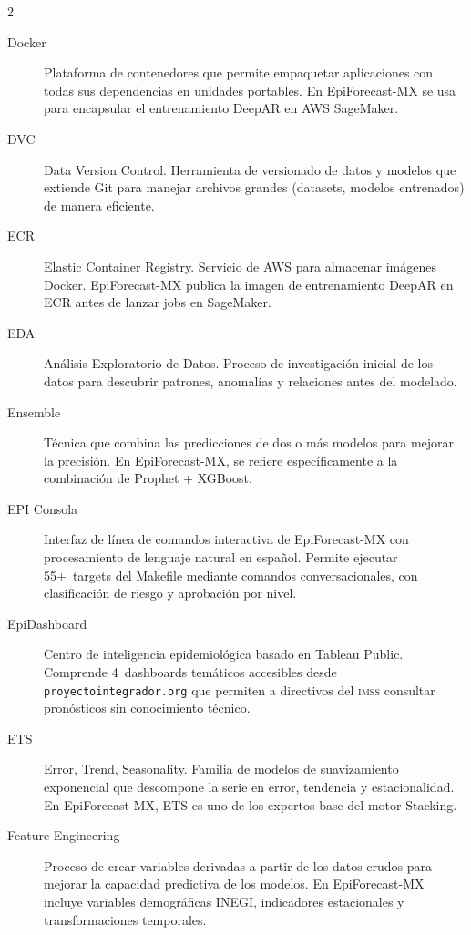 \documentclass[12pt, letterpaper]{article}
\newcommand{\imss}{\textnormal{\textsc{imss}}}
\begin{document}
\begin{multicols}{2}
\begin{description}
\item[Docker]
Plataforma de contenedores que permite empaquetar aplicaciones con todas sus dependencias en unidades portables. En EpiForecast-MX se usa para encapsular el entrenamiento DeepAR en AWS SageMaker.

\item[DVC]
Data Version Control. Herramienta de versionado de datos y modelos que extiende Git para manejar archivos grandes (datasets, modelos entrenados) de manera eficiente.

\item[ECR]
Elastic Container Registry. Servicio de AWS para almacenar imágenes Docker. EpiForecast-MX publica la imagen de entrenamiento DeepAR en ECR antes de lanzar jobs en SageMaker.

\item[EDA]
Análisis Exploratorio de Datos. Proceso de investigación inicial de los datos para descubrir patrones, anomalías y relaciones antes del modelado.

\item[Ensemble]
Técnica que combina las predicciones de dos o más modelos para mejorar la precisión. En EpiForecast-MX, se refiere específicamente a la combinación de Prophet + XGBoost.

\item[EPI Consola]
Interfaz de línea de comandos interactiva de EpiForecast-MX con procesamiento de lenguaje natural en español. Permite ejecutar 55+~targets del Makefile mediante comandos conversacionales, con clasificación de riesgo y aprobación por nivel.

\item[EpiDashboard]
Centro de inteligencia epidemiológica basado en Tableau Public. Comprende 4~dashboards temáticos accesibles desde \texttt{proyectointegrador.org} que permiten a directivos del \imss{} consultar pronósticos sin conocimiento técnico.

\item[ETS]
Error, Trend, Seasonality. Familia de modelos de suavizamiento exponencial que descompone la serie en error, tendencia y estacionalidad. En EpiForecast-MX, ETS es uno de los expertos base del motor Stacking.

\item[Feature Engineering]
Proceso de crear variables derivadas a partir de los datos crudos para mejorar la capacidad predictiva de los modelos. En EpiForecast-MX incluye variables demográficas INEGI, indicadores estacionales y transformaciones temporales.


\end{description}
\end{multicols}
\end{document}
